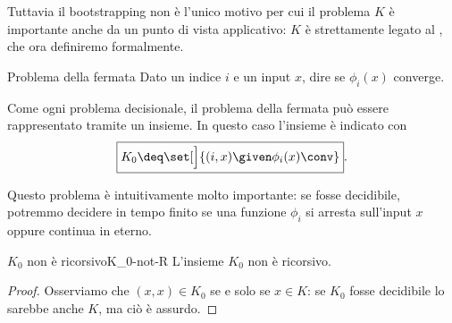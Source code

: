 \bigskip
\bigskip

Tuttavia il bootstrapping non è l'unico motivo per cui il problema $K$ è importante anche da un punto di vista applicativo: $K$ è strettamente legato al , che ora definiremo formalmente.

\begin{definition}
    {Problema della fermata}{}
    Dato un indice $i$ e un input $x$, dire se $\phi_i(x)$ converge.   
\end{definition}

Come ogni problema decisionale, il problema della fermata può essere rappresentato tramite un insieme. In questo caso l'insieme è indicato con \[
    \boxed{K_0 \deq \set[\Big]{(i, x) \given \phi_i(x)\conv}}. 
\]

Questo problema è intuitivamente molto importante: se fosse decidibile, potremmo decidere in tempo finito se una funzione $\phi_i$ si arresta sull'input $x$ oppure continua in eterno.

\begin{theorem}
    {$K_0$ non è ricorsivo}{K_0-not-R}
    L'insieme $K_0$ non è ricorsivo.
\end{theorem}
\begin{proof}
    Osserviamo che $(x, x) \in K_0$ se e solo se $x \in K$: se $K_0$ fosse decidibile lo sarebbe anche $K$, ma ciò è assurdo.    
\end{proof}